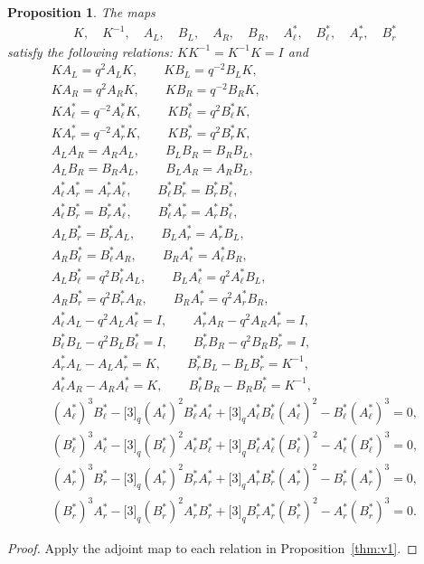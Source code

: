\documentclass[11pt]{article}
\numberwithin{equation}{section}
\numberwithin{equation}{section}
\newtheorem{Proposition}[Theorem]{Proposition}
 { \theoremstyle{definition}
\newtheorem{Definition}[Theorem]{Definition}
\newtheorem{Example}[Theorem]{Example}
\newtheorem{Note}[Theorem]{Note}
}
\begin{document}
{\begin{Proposition}\label{thm:v2}The maps
\begin{gather}\label{eq:maplist2}
K, \quad K^{-1},
\quad
A_L,
\quad
B_L,
\quad
A_R,
\quad
B_R,
\quad
A^*_\ell,
\quad
B^*_\ell,
\quad
A^*_r,
\quad
B^*_r
\end{gather}
satisfy the following relations: $K K^{-1} = K^{-1}K = I$ and
\begin{gather*}
K A_L = q^{2} A_L K,\qquad K B_L = q^{-2} B_L K,\\
K A_R = q^{2} A_R K,\qquad K B_R = q^{-2} B_R K,\\
K A^*_\ell = q^{-2} A^*_\ell K,\qquad K B^*_\ell = q^{2} B^*_\ell K,\\
K A^*_r = q^{-2} A^*_r K,\qquad K B^*_r = q^{2} B^*_r K,\\
A_L A_R = A_R A_L, \qquad B_L B_R = B_R B_L,\\
A_L B_R = B_R A_L, \qquad B_L A_R = A_R B_L,\\
A^*_\ell A^*_r = A^*_r A^*_\ell, \qquad B^*_\ell B^*_r = B^*_r B^*_\ell,\\
A^*_\ell B^*_r = B^*_r A^*_\ell, \qquad B^*_\ell A^*_r = A^*_r B^*_\ell,\\
A_L B^*_r = B^*_r A_L, \qquad B_L A^*_r = A^*_r B_L,\\
 A_R B^*_\ell = B^*_\ell A_R, \qquad B_R A^*_\ell = A^*_\ell B_R,\\
A_L B^*_\ell = q^{2} B^*_\ell A_L, \qquad B_L A^*_\ell = q^{2} A^*_\ell B_L,\\
A_R B^*_r = q^{2} B^*_r A_R, \qquad B_R A^*_r = q^{2} A^*_r B_R,\\
 A^*_\ell A_L - q^{2} A_L A^*_\ell = I,\qquad A^*_r A_R - q^2 A_R A^*_r = I,\\
 B^*_\ell B_L - q^2 B_L B^*_\ell = I,\qquad B^*_r B_R - q^2 B_R B^*_r = I,\\
A^*_r A_L - A_L A^*_r = K,\qquad B^*_r B_L - B_L B^*_r = K^{-1},\\
A^*_\ell A_R - A_R A^*_\ell = K,\qquad B^*_\ell B_R - B_R B^*_\ell = K^{-1},\\
(A^*_\ell)^3 B^*_\ell-\lbrack 3 \rbrack_q (A^*_\ell)^2 B^*_\ell A^*_\ell+
\lbrack 3 \rbrack_q A^*_\ell B^*_\ell (A^*_\ell)^2-B^*_\ell (A^*_\ell)^3 = 0,\\
(B^*_\ell)^3 A^*_\ell-\lbrack 3 \rbrack_q (B^*_\ell)^2 A^*_\ell B^*_\ell+
\lbrack 3 \rbrack_q B^*_\ell A^*_\ell (B^*_\ell)^2-A^*_\ell (B^*_\ell)^3 = 0,\\
(A^*_r)^3 B^*_r-\lbrack 3 \rbrack_q (A^*_r)^2 B^*_r A^*_r+\lbrack 3 \rbrack_q A^*_r B^*_r (A^*_r)^2-
B^*_r (A^*_r)^3 = 0,\\
(B^*_r)^3 A^*_r-\lbrack 3 \rbrack_q (B^*_r)^2 A^*_r B^*_r+
\lbrack 3 \rbrack_q B^*_r A^*_r (B^*_r)^2-A^*_r (B^*_r)^3 = 0.
\end{gather*}
\end{Proposition}
\begin{proof} Apply the adjoint map to each relation in Proposition~\ref{thm:v1}.
\end{proof}

}
\end{document}
